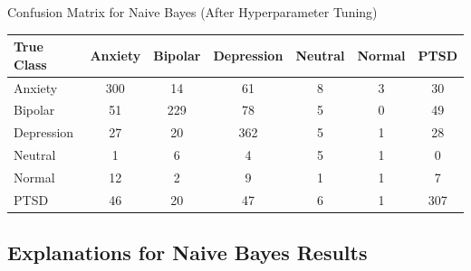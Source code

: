 \begin{center}
\caption{Confusion Matrix for Naive Bayes (After Hyperparameter Tuning)}
\begin{tabular}{|l|c|c|c|c|c|c|}
\hline
\textbf{True Class} & \textbf{Anxiety} & \textbf{Bipolar} & \textbf{Depression} & \textbf{Neutral} & \textbf{Normal} & \textbf{PTSD} \\ \hline
Anxiety             & 300              & 14               & 61                  & 8                & 3               & 30            \\ \hline
Bipolar             & 51               & 229              & 78                  & 5                & 0               & 49            \\ \hline
Depression          & 27               & 20               & 362                 & 5                & 1               & 28            \\ \hline
Neutral             & 1                & 6                & 4                   & 5                & 1               & 0             \\ \hline
Normal              & 12               & 2                & 9                   & 1                & 1               & 7             \\ \hline
PTSD                & 46               & 20               & 47                  & 6                & 1               & 307           \\ \hline
\end{tabular}    
\end{center}

\subsection{Explanations for Naive Bayes Results}


